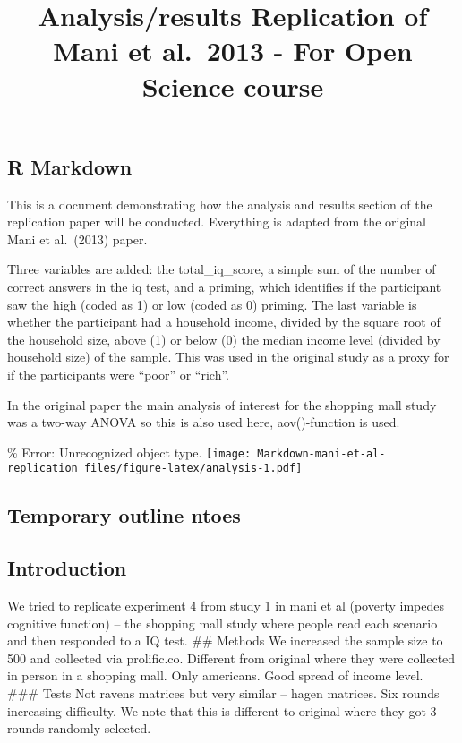 \documentclass[
]{article}
\title{Analysis/results Replication of Mani et al.~2013 - For Open
Science course}
\author{}
\date{\vspace{-2.5em}}
\begin{document}
\maketitle

\hypertarget{r-markdown}{%
\subsection{R Markdown}\label{r-markdown}}

This is a document demonstrating how the analysis and results section of
the replication paper will be conducted. Everything is adapted from the
original Mani et al.~(2013) paper.

Three variables are added: the total\_iq\_score, a simple sum of the
number of correct answers in the iq test, and a priming, which
identifies if the participant saw the high (coded as 1) or low (coded as
0) priming. The last variable is whether the participant had a household
income, divided by the square root of the household size, above (1) or
below (0) the median income level (divided by household size) of the
sample. This was used in the original study as a proxy for if the
participants were ``poor'' or ``rich''.

In the original paper the main analysis of interest for the shopping
mall study was a two-way ANOVA so this is also used here, aov()-function
is used.

\% Error: Unrecognized object type.
\texttt{[image: Markdown-mani-et-al-replication\_files/figure-latex/analysis-1.pdf]}

\hypertarget{temporary-outline-ntoes}{%
\subsection{Temporary outline ntoes}\label{temporary-outline-ntoes}}

\hypertarget{introduction}{%
\subsection{Introduction}\label{introduction}}

We tried to replicate experiment 4 from study 1 in mani et al (poverty
impedes cognitive function) -- the shopping mall study where people read
each scenario and then responded to a IQ test. \#\# Methods We increased
the sample size to 500 and collected via prolific.co. Different from
original where they were collected in person in a shopping mall. Only
americans. Good spread of income level. \#\#\# Tests Not ravens matrices
but very similar -- hagen matrices. Six rounds increasing difficulty. We
note that this is different to original where they got 3 rounds randomly
selected.
\end{document}
